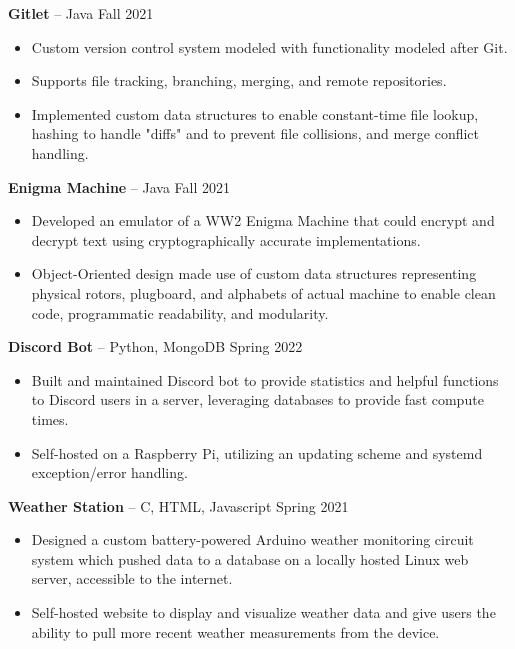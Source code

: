 \documentclass{article}
\begin{document}
    \vspace{2mm}

    \textbf{Gitlet} -- Java \hfill Fall 2021 
    \begin{itemize}
        \item Custom version control system modeled with functionality modeled after Git.
        \item Supports file tracking, branching, merging, and remote repositories.
        \item Implemented custom data structures to enable constant-time file lookup, hashing to handle "diffs" and to prevent file collisions, and merge conflict handling.
    \end{itemize}

    \vspace{2mm}

    \noindent \textbf{Enigma Machine} -- Java \hfill Fall 2021
    \begin{itemize}
        \item Developed an emulator of a WW2 Enigma Machine that could encrypt and decrypt text using cryptographically accurate implementations.
        \item Object-Oriented design made use of custom data structures representing physical rotors, plugboard, and alphabets of actual machine to enable clean code, programmatic readability, and modularity.
    \end{itemize} 

    \vspace{2mm}

    \textbf{Discord Bot} -- Python, MongoDB \hfill Spring 2022
    \begin{itemize}
        \item Built and maintained Discord bot to provide statistics and helpful functions to Discord users in a server, leveraging databases to provide fast compute times.
        \item Self-hosted on a Raspberry Pi, utilizing an updating scheme and systemd exception/error handling.
    \end{itemize}

    \vspace{2mm}

    \noindent \textbf{Weather Station} -- C, HTML, Javascript \hfill Spring 2021
    \begin{itemize}
        \item Designed a custom battery-powered Arduino weather monitoring circuit system which pushed data to a database on a locally hosted Linux web server, accessible to the internet. 
        \item Self-hosted website to display and visualize weather data and give users the ability to pull more recent weather measurements from the device.
    \end{itemize}
\end{document}
